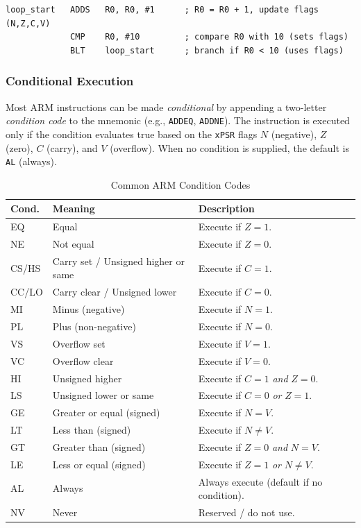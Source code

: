 \begin{lstlisting}[caption={Instruction format example}]
loop_start   ADDS   R0, R0, #1      ; R0 = R0 + 1, update flags (N,Z,C,V)
             CMP    R0, #10         ; compare R0 with 10 (sets flags)
             BLT    loop_start      ; branch if R0 < 10 (uses flags)
\end{lstlisting}
\subsubsection{Conditional Execution}

Most ARM instructions can be made \emph{conditional} by appending a two-letter
\emph{condition code} to the mnemonic (e.g., \texttt{ADDEQ}, \texttt{ADDNE}).
The instruction is executed only if the condition evaluates true based on the
\texttt{xPSR} flags $N$ (negative), $Z$ (zero), $C$ (carry), and $V$ (overflow).
When no condition is supplied, the default is \texttt{AL} (always).

\begin{table}[H]
\centering
\caption{Common ARM Condition Codes}
\small
\begin{tabularx}{0.72\linewidth}{@{}l l X@{}}
\toprule
\textbf{Cond.} & \textbf{Meaning} & \textbf{Description} \\
\midrule
EQ  & Equal                     & Execute if $Z=1$. \\
NE  & Not equal                 & Execute if $Z=0$. \\
CS/HS & Carry set / Unsigned higher or same & Execute if $C=1$. \\
CC/LO & Carry clear / Unsigned lower        & Execute if $C=0$. \\
MI  & Minus (negative)          & Execute if $N=1$. \\
PL  & Plus (non-negative)       & Execute if $N=0$. \\
VS  & Overflow set              & Execute if $V=1$. \\
VC  & Overflow clear            & Execute if $V=0$. \\
HI  & Unsigned higher           & Execute if $C=1$ \emph{and} $Z=0$. \\
LS  & Unsigned lower or same    & Execute if $C=0$ \emph{or} $Z=1$. \\
GE  & Greater or equal (signed) & Execute if $N=V$. \\
LT  & Less than (signed)        & Execute if $N\neq V$. \\
GT  & Greater than (signed)     & Execute if $Z=0$ \emph{and} $N=V$. \\
LE  & Less or equal (signed)    & Execute if $Z=1$ \emph{or} $N\neq V$. \\
AL  & Always                    & Always execute (default if no condition). \\
NV  & Never                     & Reserved / do not use. \\
\bottomrule
\end{tabularx}
\end{table}

